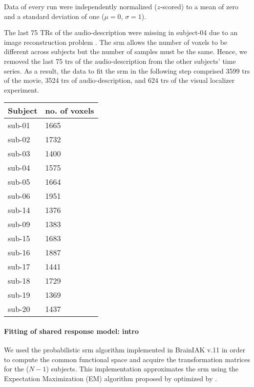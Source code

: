 Data of every run were independently normalized ($z$-scored) to a mean of zero
and a standard deviation of one ($\mu=0$, $\sigma=1$).



%
The last 75 TRs of the audio-description were missing in subject-04 due to an
image reconstruction problem \citep[s.][]{hanke2014audiomovie}.
%
The \ac{srm} allows the number of voxels to be different across subjects but the
number of samples must be the same.
%
Hence, we removed the last 75 \acp{tr} of the audio-description from the other
subjects' time series.
As a result, the data to fit the \ac{srm} in the following step comprised 3599
\acp{tr} of the movie, 3524 \acp{tr} of audio-description, and 624 \acp{tr} of
the visual localizer experiment.


\begin{table*}[btp]
    \caption{Number of remaining voxels after time series data of each paradigm
    and subject were masked with the union of individual \acp{ppa} that was
    warped from MNI space into each individual's subjects-space and the
    subject-specific field of view of audio-description.}

\label{tab:ppamaskvoxels}
\begin{tabular}{ll}
\toprule
\textbf{Subject} & \textbf{no. of voxels} \\
\midrule
sub-01 & 1665 \tabularnewline
sub-02 & 1732 \tabularnewline
sub-03 & 1400 \tabularnewline
sub-04 & 1575 \tabularnewline
sub-05 & 1664 \tabularnewline
sub-06 & 1951 \tabularnewline
sub-14 & 1376 \tabularnewline
sub-09 & 1383 \tabularnewline
sub-15 & 1683 \tabularnewline
sub-16 & 1887 \tabularnewline
sub-17 & 1441 \tabularnewline
sub-18 & 1729 \tabularnewline
sub-19 & 1369 \tabularnewline
sub-20 & 1437 \tabularnewline
\bottomrule
\end{tabular}
\end{table*}


\paragraph{Fitting of shared response model: intro}


We used the probabilistic \ac{srm} algorithm implemented in BrainIAK v.11
\citep[Brain Imaging Analysis Kit;][]{kumar2020brainiak,
kumar2020brainiaktutorial} in order to compute the common functional space and
acquire the transformation matrices for the ($N-1$) subjects.
%
This implementation approximates the \ac{srm} using the Expectation Maximization
(EM) algorithm proposed by \citep{chen2015reduced} optimized by
\citet{anderson2016enabling}.


